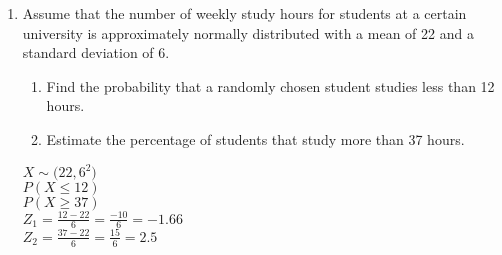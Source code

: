\begin{enumerate}
	
	\item Assume that the number of weekly study hours for students at a certain university
	is approximately normally distributed with a mean of 22 and a standard deviation
	of 6.
	\begin{enumerate}
		\item Find the probability that a randomly chosen student studies less than 12
		hours.
		\item Estimate the percentage of students that study more than 37 hours.
	\end{enumerate}
	
	
	$X \sim \mathcal(22,6^2)$\\
	$P(X \leq 12)$\\
	$P(X \geq 37)$\\
	$Z_1 = \frac{12 - 22}{6} = \frac{-10}{6} = -1.66 $\\
	$Z_2 = \frac{37 - 22}{6} = \frac{15}{6} = 2.5 $
	
	
\end{enumerate}















		




